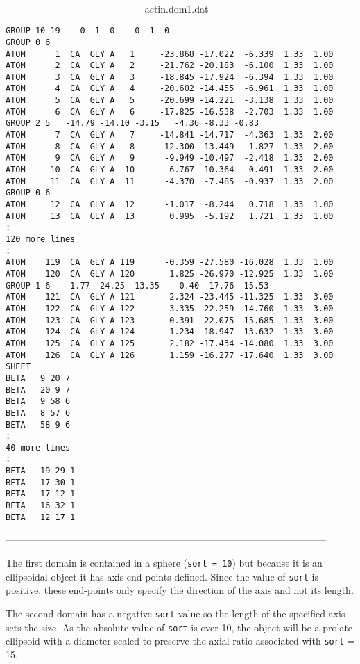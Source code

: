 \begin{singlespace}
\ \\
------------------------------------------
actin.dom1.dat
---------------------------------------
\begin{verbatim}
GROUP 10 19    0  1  0    0 -1  0
GROUP 0 6
ATOM      1  CA  GLY A   1     -23.868 -17.022  -6.339  1.33  1.00
ATOM      2  CA  GLY A   2     -21.762 -20.183  -6.100  1.33  1.00
ATOM      3  CA  GLY A   3     -18.845 -17.924  -6.394  1.33  1.00
ATOM      4  CA  GLY A   4     -20.602 -14.455  -6.961  1.33  1.00
ATOM      5  CA  GLY A   5     -20.699 -14.221  -3.138  1.33  1.00
ATOM      6  CA  GLY A   6     -17.825 -16.538  -2.703  1.33  1.00
GROUP 2 5   -14.79 -14.10 -3.15   -4.36 -8.33 -0.83
ATOM      7  CA  GLY A   7     -14.841 -14.717  -4.363  1.33  2.00
ATOM      8  CA  GLY A   8     -12.300 -13.449  -1.827  1.33  2.00
ATOM      9  CA  GLY A   9      -9.949 -10.497  -2.418  1.33  2.00
ATOM     10  CA  GLY A  10      -6.767 -10.364  -0.491  1.33  2.00
ATOM     11  CA  GLY A  11      -4.370  -7.485  -0.937  1.33  2.00
GROUP 0 6
ATOM     12  CA  GLY A  12      -1.017  -8.244   0.718  1.33  1.00
ATOM     13  CA  GLY A  13       0.995  -5.192   1.721  1.33  1.00
:
120 more lines
:
ATOM    119  CA  GLY A 119      -0.359 -27.580 -16.028  1.33  1.00
ATOM    120  CA  GLY A 120       1.825 -26.970 -12.925  1.33  1.00
GROUP 1 6    1.77 -24.25 -13.35    0.40 -17.76 -15.53
ATOM    121  CA  GLY A 121       2.324 -23.445 -11.325  1.33  3.00
ATOM    122  CA  GLY A 122       3.335 -22.259 -14.760  1.33  3.00
ATOM    123  CA  GLY A 123      -0.391 -22.075 -15.685  1.33  3.00
ATOM    124  CA  GLY A 124      -1.234 -18.947 -13.632  1.33  3.00
ATOM    125  CA  GLY A 125       2.182 -17.434 -14.080  1.33  3.00
ATOM    126  CA  GLY A 126       1.159 -16.277 -17.640  1.33  3.00
SHEET
BETA   9 20 7
BETA   20 9 7
BETA   9 58 6
BETA   8 57 6
BETA   58 9 6
:
40 more lines
:
BETA   19 29 1
BETA   17 30 1
BETA   17 12 1
BETA   16 32 1
BETA   12 17 1
\end{verbatim}
---------------------------------------------------------------------------------------------------
\end{singlespace}

The first domain is contained in a sphere ({\tt sort = 10}) but because it is an ellipsoidal object
it has axis end-points defined.  Since the value of {\tt sort} is positive, these end-points only
specify the direction of the axis and not its length.

The second domain has a negative {\tt sort} value so the length of the specified axis sets the size.
As the absolute value of {\tt sort} is over 10, the object will be a prolate ellipsoid with a 
diameter scaled to preserve the axial ratio associated with {\tt sort} = 15.

